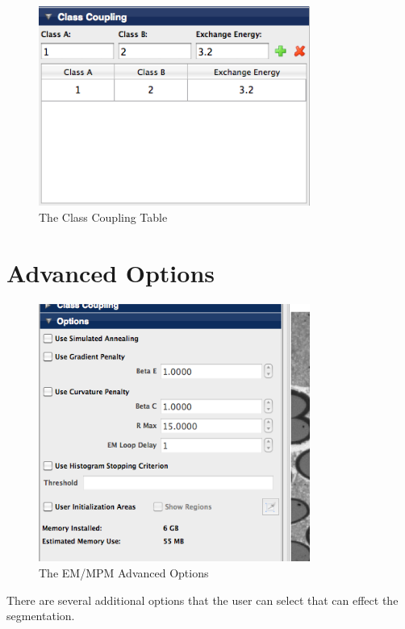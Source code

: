 \documentclass[12pt,oneside]{book}
\begin{document}
\begin{figure}[htbp]
\begin{center}
\includegraphics[width=3.5in]{images/Untitled14.png}
\caption{The Class Coupling Table}
\label{Untitled14}
\end{center}
\end{figure}

\section{Advanced Options}

\begin{figure}[htbp]
\begin{center}
\includegraphics[width=3.5in]{images/Untitled4.png}
\caption{The EM/MPM Advanced Options}
\label{Untitled4}
\end{center}
\end{figure}
There are several additional options that the user can select that can effect the segmentation. 
\end{document}
